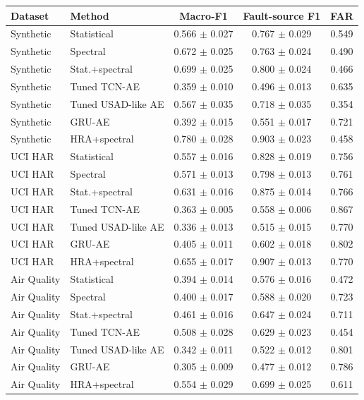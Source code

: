 \begin{tabularx}{\textwidth}{l>{\raggedright\arraybackslash}Xccc}
\toprule
Dataset & Method & Macro-F1 & Fault-source F1 & FAR \\
\midrule
Synthetic & Statistical & 0.566 $\pm$ 0.027 & 0.767 $\pm$ 0.029 & 0.549 \\
Synthetic & Spectral & 0.672 $\pm$ 0.025 & 0.763 $\pm$ 0.024 & 0.490 \\
Synthetic & Stat.+spectral & 0.699 $\pm$ 0.025 & 0.800 $\pm$ 0.024 & 0.466 \\
Synthetic & Tuned TCN-AE & 0.359 $\pm$ 0.010 & 0.496 $\pm$ 0.013 & 0.635 \\
Synthetic & Tuned USAD-like AE & 0.567 $\pm$ 0.035 & 0.718 $\pm$ 0.035 & 0.354 \\
Synthetic & GRU-AE & 0.392 $\pm$ 0.015 & 0.551 $\pm$ 0.017 & 0.721 \\
Synthetic & HRA+spectral & 0.780 $\pm$ 0.028 & 0.903 $\pm$ 0.023 & 0.458 \\
UCI HAR & Statistical & 0.557 $\pm$ 0.016 & 0.828 $\pm$ 0.019 & 0.756 \\
UCI HAR & Spectral & 0.571 $\pm$ 0.013 & 0.798 $\pm$ 0.013 & 0.761 \\
UCI HAR & Stat.+spectral & 0.631 $\pm$ 0.016 & 0.875 $\pm$ 0.014 & 0.766 \\
UCI HAR & Tuned TCN-AE & 0.363 $\pm$ 0.005 & 0.558 $\pm$ 0.006 & 0.867 \\
UCI HAR & Tuned USAD-like AE & 0.336 $\pm$ 0.013 & 0.515 $\pm$ 0.015 & 0.770 \\
UCI HAR & GRU-AE & 0.405 $\pm$ 0.011 & 0.602 $\pm$ 0.018 & 0.802 \\
UCI HAR & HRA+spectral & 0.655 $\pm$ 0.017 & 0.907 $\pm$ 0.013 & 0.770 \\
Air Quality & Statistical & 0.394 $\pm$ 0.014 & 0.576 $\pm$ 0.016 & 0.472 \\
Air Quality & Spectral & 0.400 $\pm$ 0.017 & 0.588 $\pm$ 0.020 & 0.723 \\
Air Quality & Stat.+spectral & 0.461 $\pm$ 0.016 & 0.647 $\pm$ 0.024 & 0.711 \\
Air Quality & Tuned TCN-AE & 0.508 $\pm$ 0.028 & 0.629 $\pm$ 0.023 & 0.454 \\
Air Quality & Tuned USAD-like AE & 0.342 $\pm$ 0.011 & 0.522 $\pm$ 0.012 & 0.801 \\
Air Quality & GRU-AE & 0.305 $\pm$ 0.009 & 0.477 $\pm$ 0.012 & 0.786 \\
Air Quality & HRA+spectral & 0.554 $\pm$ 0.029 & 0.699 $\pm$ 0.025 & 0.611 \\
\bottomrule
\end{tabularx}
